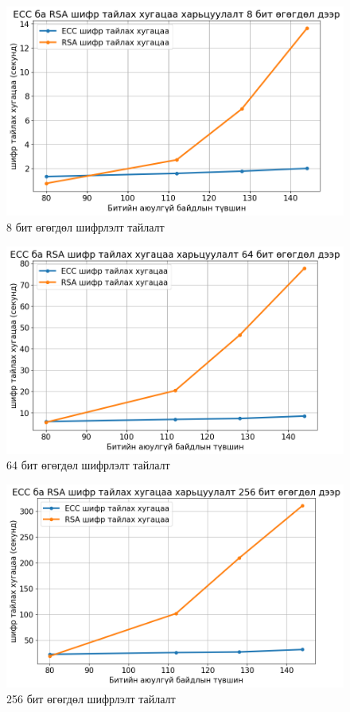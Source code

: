 	\begin{figure}
		\centering
		\includegraphics[scale=0.65]{assets/graphs/4.png}
		\caption{8 бит өгөгдөл шифрлэлт тайлалт}
		\label{fig:architecture}
	\end{figure}
	\begin{figure}
		\centering
		\includegraphics[scale=0.65]{assets/graphs/5.png}
		\caption{64 бит өгөгдөл шифрлэлт тайлалт}
		\label{fig:architecture}
	\end{figure}
	\begin{figure}
		\centering
		\includegraphics[scale=0.65]{assets/graphs/6.png}
		\caption{256 бит өгөгдөл шифрлэлт тайлалт}
		\label{fig:architecture}
	\end{figure}
